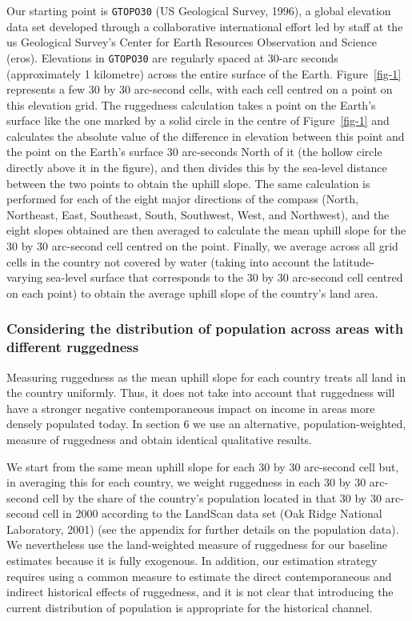 \documentclass[
  letterpaper,
  DIV=11,
  numbers=noendperiod]{scrartcl}
\begin{document}
Our starting point is \texttt{GTOPO30} (US Geological Survey, 1996), a
global elevation data set developed through a collaborative
international effort led by staff at the us Geological Survey's Center
for Earth Resources Observation and Science (eros). Elevations in
\texttt{GTOPO30} are regularly spaced at 30-arc seconds (approximately 1
kilometre) across the entire surface of the Earth. Figure~\ref{fig-1}
represents a few 30 by 30 arc-second cells, with each cell centred on a
point on this elevation grid. The ruggedness calculation takes a point
on the Earth's surface like the one marked by a solid circle in the
centre of Figure~\ref{fig-1} and calculates the absolute value of the
difference in elevation between this point and the point on the Earth's
surface 30 arc-seconds North of it (the hollow circle directly above it
in the figure), and then divides this by the sea-level distance between
the two points to obtain the uphill slope. The same calculation is
performed for each of the eight major directions of the compass (North,
Northeast, East, Southeast, South, Southwest, West, and Northwest), and
the eight slopes obtained are then averaged to calculate the mean uphill
slope for the 30 by 30 arc-second cell centred on the point. Finally, we
average across all grid cells in the country not covered by water
(taking into account the latitude-varying sea-level surface that
corresponds to the 30 by 30 arc-second cell centred on each point) to
obtain the average uphill slope of the country's land area.

\subsubsection{Considering the distribution of population across areas
with different
ruggedness}\label{considering-the-distribution-of-population-across-areas-with-different-ruggedness}

Measuring ruggedness as the mean uphill slope for each country treats
all land in the country uniformly. Thus, it does not take into account
that ruggedness will have a stronger negative contemporaneous impact on
income in areas more densely populated today. In section 6 we use an
alternative, population-weighted, measure of ruggedness and obtain
identical qualitative results.

We start from the same mean uphill slope for each 30 by 30 arc-second
cell but, in averaging this for each country, we weight ruggedness in
each 30 by 30 arc-second cell by the share of the country's population
located in that 30 by 30 arc-second cell in 2000 according to the
LandScan data set (Oak Ridge National Laboratory, 2001) (see the
appendix for further details on the population data). We nevertheless
use the land-weighted measure of ruggedness for our baseline estimates
because it is fully exogenous. In addition, our estimation strategy
requires using a common measure to estimate the direct contemporaneous
and indirect historical effects of ruggedness, and it is not clear that
introducing the current distribution of population is appropriate for
the historical channel.
\end{document}
